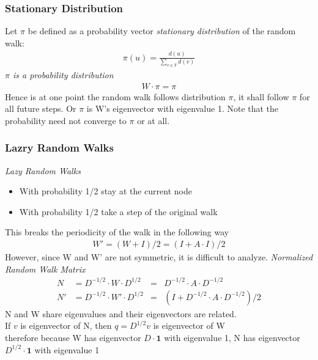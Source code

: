 \documentclass[12pt, letterpaper]{report}
\begin{document}
    \subsubsection{Stationary Distribution}
    Let $\pi$ be defined as a probability vector \textit{stationary distribution} of the random walk:
    \begin{gather*}
        \pi (u) = \frac{d(u)}{\sum_{v \in V} d(v)}
    \end{gather*}
    \textit{$\pi$ is a probability distribution}\\
    \begin{gather*}
        W \cdot \pi = \pi
    \end{gather*}
    Hence is at one point the random walk follows distribution $\pi$, it shall follow $\pi$ for all future steps. Or $\pi$ is 
    W's eigenvector with eigenvalue 1. Note that the probability need not converge to $\pi$ or at all.\\
    \subsubsection{Lazry Random Walks}
    \textit{Lazy Random Walks}
    \begin{itemize}
        \item With probability 1/2 stay at the current node
        \item With probability 1/2 take a step of the original walk
    \end{itemize}
    This breaks the periodicity of the walk in the following way
    \begin{gather*}
        W' = (W+I) /2=(I+A\cdot I)/2
    \end{gather*}
    However, since W and W' are not symmetric, it is difficult to analyze. \textit{Normalized Random Walk Matrix}
    \begin{align*}
        N &= D ^{-1/2} \cdot W \cdot D ^{1/2} &=&D ^{-1/2} \cdot A \cdot D^{-1/2}\\
        N' & = D ^{-1/2} \cdot W' \cdot D^{1/2}&=&(I+D^{-1/2}\cdot A \cdot D^{-1/2})/2
    \end{align*}
    N and W share eigenvalues and their eigenvectors are related.\\
    \indent If $v$ is eigenvector of N, then $q = D^{1/2}v$ is eigenvector of W\\
    \indent therefore because W has eigenvector $D \cdot \mathbf{1}$ with eigenvalue 1, N has eigenvector $D^{1/2}\cdot \mathbf{1}$
    with eigenvalue 1
\end{document}

